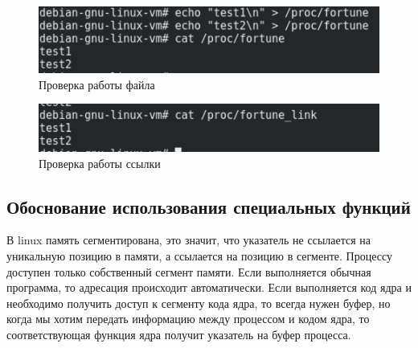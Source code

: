 \begin{figure}[H]
    \centering
    \includegraphics{img/part_02/test_file.png}
    \caption{Проверка работы файла}
\end{figure}

\begin{figure}[H]
    \centering
    \includegraphics{img/part_02/test_link.png}
    \caption{Проверка работы ссылки}
\end{figure}

\subsection{Обоснование использования специальных функций}

В linux память сегментирована, это значит, что указатель не
ссылается на уникальную позицию в памяти, а ссылается на
позицию в сегменте. Процессу доступен только собственный сегмент
памяти. Если выполняется обычная программа, то адресация
происходит автоматически. Если выполняется код ядра и необходимо
получить доступ к сегменту кода ядра, то всегда нужен буфер, но
когда мы хотим передать информацию между процессом и кодом ядра,
то соответствующая функция ядра получит указатель на буфер процесса.
